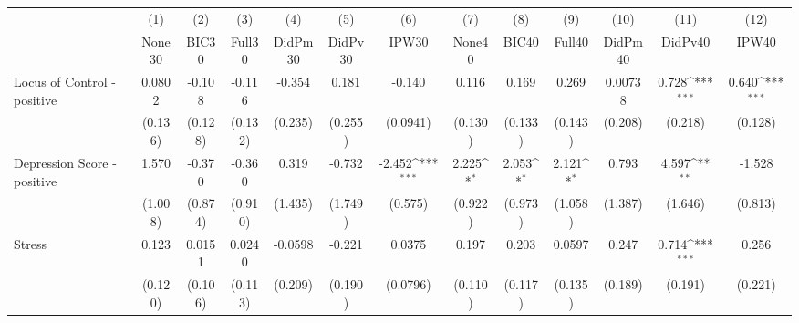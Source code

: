 {
\def\sym#1{\ifmmode^{#1}\else\(^{#1}\)\fi}
\begin{tabular}{l*{12}{c}}
\toprule
            &\multicolumn{1}{c}{(1)}&\multicolumn{1}{c}{(2)}&\multicolumn{1}{c}{(3)}&\multicolumn{1}{c}{(4)}&\multicolumn{1}{c}{(5)}&\multicolumn{1}{c}{(6)}&\multicolumn{1}{c}{(7)}&\multicolumn{1}{c}{(8)}&\multicolumn{1}{c}{(9)}&\multicolumn{1}{c}{(10)}&\multicolumn{1}{c}{(11)}&\multicolumn{1}{c}{(12)}\\
            &\multicolumn{1}{c}{None30}&\multicolumn{1}{c}{BIC30}&\multicolumn{1}{c}{Full30}&\multicolumn{1}{c}{DidPm30}&\multicolumn{1}{c}{DidPv30}&\multicolumn{1}{c}{IPW30}&\multicolumn{1}{c}{None40}&\multicolumn{1}{c}{BIC40}&\multicolumn{1}{c}{Full40}&\multicolumn{1}{c}{DidPm40}&\multicolumn{1}{c}{DidPv40}&\multicolumn{1}{c}{IPW40}\\
\midrule
Locus of Control - positive&      0.0802         &      -0.108         &      -0.116         &      -0.354         &       0.181         &      -0.140         &       0.116         &       0.169         &       0.269         &     0.00738         &       0.728\sym{***}&       0.640\sym{***}\\
            &     (0.136)         &     (0.128)         &     (0.132)         &     (0.235)         &     (0.255)         &    (0.0941)         &     (0.130)         &     (0.133)         &     (0.143)         &     (0.208)         &     (0.218)         &     (0.128)         \\
\addlinespace
Depression Score - positive&       1.570         &      -0.370         &      -0.360         &       0.319         &      -0.732         &      -2.452\sym{***}&       2.225\sym{*}  &       2.053\sym{*}  &       2.121\sym{*}  &       0.793         &       4.597\sym{**} &      -1.528         \\
            &     (1.008)         &     (0.874)         &     (0.910)         &     (1.435)         &     (1.749)         &     (0.575)         &     (0.922)         &     (0.973)         &     (1.058)         &     (1.387)         &     (1.646)         &     (0.813)         \\
\addlinespace
Stress      &       0.123         &      0.0151         &      0.0240         &     -0.0598         &      -0.221         &      0.0375         &       0.197         &       0.203         &      0.0597         &       0.247         &       0.714\sym{***}&       0.256         \\
            &     (0.120)         &     (0.106)         &     (0.113)         &     (0.209)         &     (0.190)         &    (0.0796)         &     (0.110)         &     (0.117)         &     (0.135)         &     (0.189)         &     (0.191)         &     (0.221)         \\

\end{tabular}}
